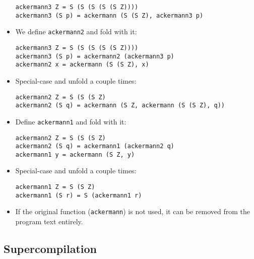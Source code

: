 \begin{itemize}
\begin{verbatim}
ackermann3 Z = S (S (S (S (S Z))))
ackermann3 (S p) = ackermann (S (S Z), ackermann3 p)
\end{verbatim}

\item We define \texttt{ackermann2} and fold with it:

\begin{verbatim}
ackermann3 Z = S (S (S (S (S Z))))
ackermann3 (S p) = ackermann2 (ackermann3 p)
ackermann2 x = ackermann (S (S Z), x)
\end{verbatim}

\item Special-case and unfold a couple times:

\begin{verbatim}
ackermann2 Z = S (S (S Z)
ackermann2 (S q) = ackermann (S Z, ackermann (S (S Z), q))
\end{verbatim}

\item Define \texttt{ackermann1} and fold with it:

\begin{verbatim}
ackermann2 Z = S (S (S Z)
ackermann2 (S q) = ackermann1 (ackermann2 q)
ackermann1 y = ackermann (S Z, y)
\end{verbatim} 

\item Special-case and unfold a couple times:

\begin{verbatim}
ackermann1 Z = S (S Z)
ackermann1 (S r) = S (ackermann1 r)
\end{verbatim}

\item If the original function (\texttt{ackermann}) is not used, it can be
removed from the program text entirely.

\end{itemize}

\subsection{Supercompilation}

